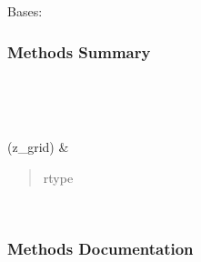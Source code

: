 \documentclass[letterpaper,10pt,english]{sphinxmanual}
\begin{document}
\begin{fulllineitems}
\label{\detokenize{api/seyfert.cosmology.bias.ConstantBias:seyfert.cosmology.bias.ConstantBias}}
\sphinxAtStartPar
Bases: {\hyperref[\detokenize{api/seyfert.cosmology.bias.BiasModel:seyfert.cosmology.bias.BiasModel}]{}}
\subsubsection*{Methods Summary}


\begin{savenotes}\sphinxatlongtablestart\begin{longtable}[c]{}
\hline

\endfirsthead

%
{}\\
\hline

\endhead

\hline
{}\\
\endfoot

\endlastfoot

\sphinxAtStartPar
{\hyperref[\detokenize{api/seyfert.cosmology.bias.ConstantBias:seyfert.cosmology.bias.ConstantBias.computeBias}]{}}(z\_grid)
&
\sphinxAtStartPar
\begin{quote}\begin{description}
\item[{rtype}] \leavevmode
\sphinxAtStartPar
{}

\end{description}\end{quote}

\\
\hline
\end{longtable}\sphinxatlongtableend\end{savenotes}
\subsubsection*{Methods Documentation}


\end{fulllineitems}
\end{document}
